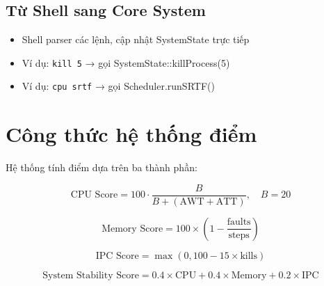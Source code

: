 \subsection{Từ Shell sang Core System}

\begin{itemize}[leftmargin=1.5cm]
  \item Shell parser các lệnh, cập nhật SystemState trực tiếp
  \item Ví dụ: \verb|kill 5| → gọi SystemState::killProcess(5)
  \item Ví dụ: \verb|cpu srtf| → gọi Scheduler.runSRTF()
\end{itemize}

\section{Công thức hệ thống điểm}

Hệ thống tính điểm dựa trên ba thành phần:

\begin{equation}
\text{CPU Score} = 100 \cdot \frac{B}{B + (\text{AWT} + \text{ATT})}, \quad B = 20
\end{equation}

\begin{equation}
\text{Memory Score} = 100 \times \left(1 - \frac{\text{faults}}{\text{steps}}\right)
\end{equation}

\begin{equation}
\text{IPC Score} = \max\left(0, 100 - 15 \times \text{kills}\right)
\end{equation}

\begin{equation}
\text{System Stability Score} = 0.4 \times \text{CPU} + 0.4 \times \text{Memory} + 0.2 \times \text{IPC}
\end{equation}

\clearpage
